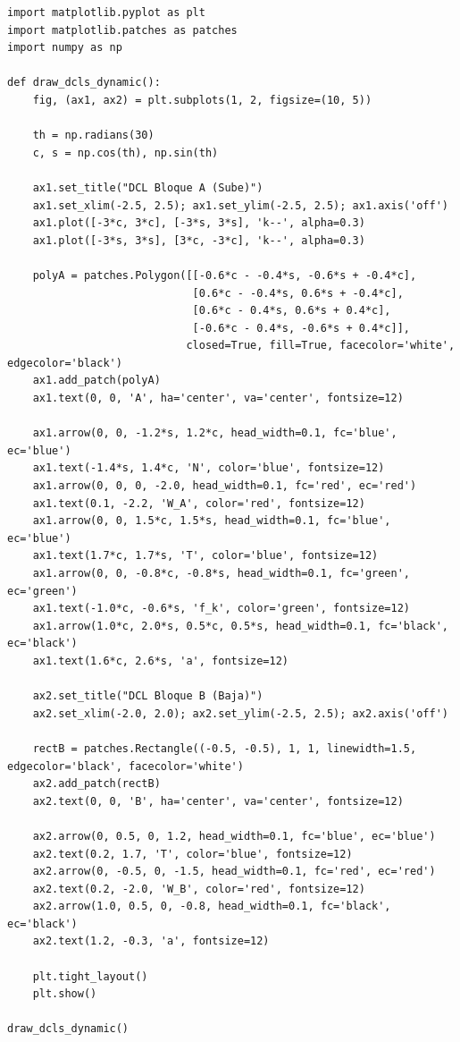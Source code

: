 \documentclass[12pt, a4paper]{article}
\begin{document}
\begin{lstlisting}
import matplotlib.pyplot as plt
import matplotlib.patches as patches
import numpy as np

def draw_dcls_dynamic():
    fig, (ax1, ax2) = plt.subplots(1, 2, figsize=(10, 5))
    
    th = np.radians(30)
    c, s = np.cos(th), np.sin(th)
    
    ax1.set_title("DCL Bloque A (Sube)")
    ax1.set_xlim(-2.5, 2.5); ax1.set_ylim(-2.5, 2.5); ax1.axis('off')
    ax1.plot([-3*c, 3*c], [-3*s, 3*s], 'k--', alpha=0.3)
    ax1.plot([-3*s, 3*s], [3*c, -3*c], 'k--', alpha=0.3)
    
    polyA = patches.Polygon([[-0.6*c - -0.4*s, -0.6*s + -0.4*c], 
                             [0.6*c - -0.4*s, 0.6*s + -0.4*c], 
                             [0.6*c - 0.4*s, 0.6*s + 0.4*c], 
                             [-0.6*c - 0.4*s, -0.6*s + 0.4*c]], 
                            closed=True, fill=True, facecolor='white', edgecolor='black')
    ax1.add_patch(polyA)
    ax1.text(0, 0, 'A', ha='center', va='center', fontsize=12)
    
    ax1.arrow(0, 0, -1.2*s, 1.2*c, head_width=0.1, fc='blue', ec='blue')
    ax1.text(-1.4*s, 1.4*c, 'N', color='blue', fontsize=12)
    ax1.arrow(0, 0, 0, -2.0, head_width=0.1, fc='red', ec='red')
    ax1.text(0.1, -2.2, 'W_A', color='red', fontsize=12)
    ax1.arrow(0, 0, 1.5*c, 1.5*s, head_width=0.1, fc='blue', ec='blue')
    ax1.text(1.7*c, 1.7*s, 'T', color='blue', fontsize=12)
    ax1.arrow(0, 0, -0.8*c, -0.8*s, head_width=0.1, fc='green', ec='green')
    ax1.text(-1.0*c, -0.6*s, 'f_k', color='green', fontsize=12)
    ax1.arrow(1.0*c, 2.0*s, 0.5*c, 0.5*s, head_width=0.1, fc='black', ec='black')
    ax1.text(1.6*c, 2.6*s, 'a', fontsize=12)
    
    ax2.set_title("DCL Bloque B (Baja)")
    ax2.set_xlim(-2.0, 2.0); ax2.set_ylim(-2.5, 2.5); ax2.axis('off')
    
    rectB = patches.Rectangle((-0.5, -0.5), 1, 1, linewidth=1.5, edgecolor='black', facecolor='white')
    ax2.add_patch(rectB)
    ax2.text(0, 0, 'B', ha='center', va='center', fontsize=12)
    
    ax2.arrow(0, 0.5, 0, 1.2, head_width=0.1, fc='blue', ec='blue')
    ax2.text(0.2, 1.7, 'T', color='blue', fontsize=12)
    ax2.arrow(0, -0.5, 0, -1.5, head_width=0.1, fc='red', ec='red')
    ax2.text(0.2, -2.0, 'W_B', color='red', fontsize=12)
    ax2.arrow(1.0, 0.5, 0, -0.8, head_width=0.1, fc='black', ec='black')
    ax2.text(1.2, -0.3, 'a', fontsize=12)

    plt.tight_layout()
    plt.show()

draw_dcls_dynamic()
\end{lstlisting}
\end{document}
